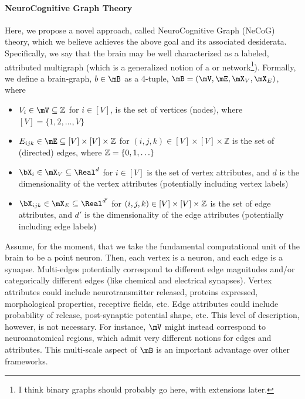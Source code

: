 \paragraph{NeuroCognitive Graph Theory}

Here, we propose a novel approach, called NeuroCognitive Graph (NeCoG) theory, which we believe achieves the above goal and its associated desiderata.  Specifically, we say that the brain may be well characterized as a labeled, attributed multigraph (which is a generalized notion of a or network\footnote{I think binary graphs should probably go here, with extensions later.}).  Formally, we define a brain-graph, $b\in \mB$ as a 4-tuple, $\mB=(\mV,\mE,\mX_V, \mX_E)$, where

\begin{itemize}
	\item $V_i \in \mV \subseteq \mathbb{Z}$ for $i \in [V]$, is the set of vertices (nodes), where $[V]=\{1,2,\ldots,V\}$ 
	\item $E_{ijk} \in \mE \subseteq [V] \times [V] \times \mathbb{Z}$ for $(i,j,k) \in [V] \times [V] \times \mathbb{Z}$ is the set of (directed) edges, where $\mathbb{Z}=\{0,1,\ldots\}$
	\item $\bX_i \in \mX_V \subseteq \Real^d$ for $i \in [V]$ is the set of vertex attributes, and $d$ is the dimensionality of the vertex attributes (potentially including vertex labels)
	\item $\bX_{ijk} \in \mX_E \subseteq \Real^{d'}$ for $(i,j,k) \in [V] \times [V] \times \mathbb{Z}$ is the set of edge attributes, and $d'$ is the dimensionality of the edge attributes (potentially including edge labels)
\end{itemize}


Assume, for the moment, that we take the fundamental computational unit of the brain to be a point neuron.  Then, each vertex is a neuron, and each edge is a synapse.   Multi-edges potentially correspond to different edge magnitudes and/or categorically different edges (like chemical and electrical synapses). Vertex attributes could include neurotransmitter released, proteins expressed, morphological properties, receptive fields, etc.  Edge attributes could include probability of release, post-synaptic potential shape, etc.  This level of description, however, is not necessary.  For instance, $\mV$ might instead correspond to neuroanatomical regions, which admit very different notions for edges and attributes.  This multi-scale aspect of $\mB$ is an important advantage over other frameworks.  

